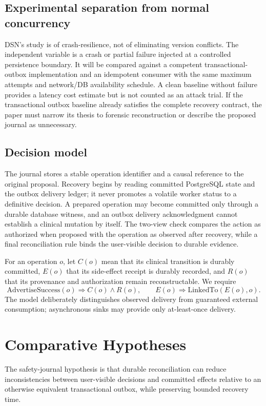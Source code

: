 \documentclass[11pt,a4paper]{article}
\begin{document}
\subsection{Experimental separation from normal concurrency}
DSN's study is of crash-resilience, not of eliminating version conflicts. The independent variable is a crash or partial failure injected at a controlled persistence boundary. It will be compared against a competent transactional-outbox implementation and an idempotent consumer with the same maximum attempts and network/DB availability schedule. A clean baseline without failure provides a latency cost estimate but is not counted as an attack trial. If the transactional outbox baseline already satisfies the complete recovery contract, the paper must narrow its thesis to forensic reconstruction or describe the proposed journal as unnecessary.


\subsection{Decision model}
The journal stores a stable operation identifier and a causal reference to the original proposal. Recovery begins by reading committed PostgreSQL state and the outbox delivery ledger; it never promotes a volatile worker status to a definitive decision. A prepared operation may become committed only through a durable database witness, and an outbox delivery acknowledgment cannot establish a clinical mutation by itself. The two-view check compares the action as authorized when proposed with the operation as observed after recovery, while a final reconciliation rule binds the user-visible decision to durable evidence.

For an operation $o$, let $C(o)$ mean that its clinical transition is durably committed, $E(o)$ that its side-effect receipt is durably recorded, and $R(o)$ that its provenance and authorization remain reconstructable. We require
\begin{equation}
\mathrm{AdvertiseSuccess}(o)\Rightarrow C(o)\land R(o),\qquad
E(o)\Rightarrow \mathrm{LinkedTo}(E(o),o).
\end{equation}
The model deliberately distinguishes observed delivery from guaranteed external consumption; asynchronous sinks may provide only at-least-once delivery.

\section{Comparative Hypotheses}
The safety-journal hypothesis is that durable reconciliation can reduce inconsistencies between user-visible decisions and committed effects relative to an otherwise equivalent transactional outbox, while preserving bounded recovery time.
\end{document}
